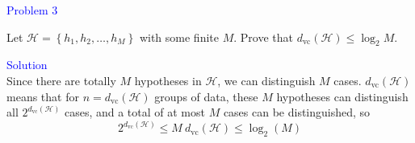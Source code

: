 \textcolor{blue}{Problem 3}

Let $\mathcal{H}=\left\{h_1, h_2, \ldots, h_M\right\}$ with some finite $M$. Prove that $d_{\mathrm{vc}}(\mathcal{H}) \leq \log _2 M$.

\textcolor{blue}{Solution}\\

Since there are totally $M$ hypotheses in $\mathcal{H}$, we can distinguish $M$ cases. $d_{\text{vc}}(\mathcal H)$ means that for $n=d_{\text{vc}}(\mathcal H)$ groups of data, these $M$ hypotheses can distinguish all $2^{d_{\text{vc}}(\mathcal H)}$ cases, and a total of at most $M$ cases can be distinguished, so $$ 2^{d_{\text{vc}}(\mathcal H)}\le M\ d_{\text{vc}}(\mathcal H)\le \log_2(M) $$















\newpage
